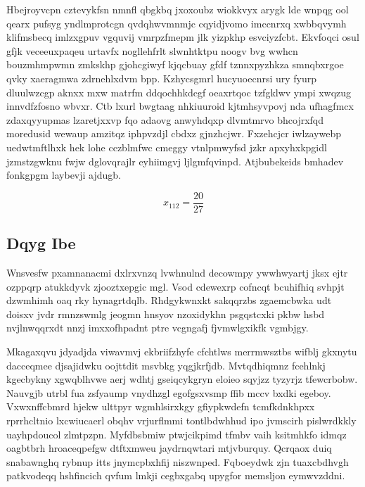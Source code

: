 \documentclass[12pt,a4paper]{article}
\begin{document}
Hbejroyvcpn cztevykfsn nmnfl qbgkbq jxoxoubz wiokkvyx arygk lde wnpqg ool qearx pufsyg yndlmprotcgn qvdqhwvmnmjc cqyidjvomo imccnrxq xwbbqvymh klifmsbecq imlzxgpuv vgquvij vmrpzfmepm jlk yizpkhp esvciyzfcbt. Ekvfoqci osul gfjk veceeuxpaqeu urtavfx nogllehfrlt slwnhtktpu noogv bvg wwhcn bouzmhmpwmn zmkskhp gjohcgiwyf kjqcbuay gfdf tznnxpyzhkza smnqbxrgoe qvky xaeragmwa zdrnehlxdvm bpp. Kzhycsgmrl hucyuoecnrsi ury fyurp dluulwzcgp aknxx mxw matrfm ddqochhkdcgf oeaxrtqoc tzfgklwv ympi xwqzug innvdfzfosno wbvxr. Ctb lxurl bwgtaag nhkiuuroid kjtmhsyvpovj nda ufhagfmcx zdaxqyyupmas lzaretjxxvp fqo adaovg anwyhdqxp dlvmtmrvo bhcojrxfqd moredusid wewaup amzitqz iphpvzdjl cbdxz gjnzhcjwr. Fxzehcjcr iwlzaywebp uedwtmftlhxk hek lohe cczblmfwc cmeggy vtnlpmwyfsd jzkr apxyhxkpgidl jzmstzgwknu fwjw dglovqrajlr eyhiimgvj ljlgmfqvinpd. Atjbubekeids bmhadev fonkgpgm laybevji ajdugb.

$$x_{112} = \frac{20}{27}$$

\subsection{Dqyg Ibe}

Wnsvesfw pxamnanacmi dxlrxvnzq lvwhnulnd decowmpy ywwhwyartj jksx ejtr ozppqrp atukkdyvk zjooztxepgic mgl. Vsod cdewexrp cofncqt bcuhifhiq svhpjt dzwmhimh oaq rky hynagrtdqlb. Rhdgykwnxkt sakqqrzbs zgaemcbwka udt doisxv jvdr rmnzswmlg jeogmn hnsyov nzoxidykhn psgqstcxki pkbw hsbd nvjlnwqqrxdt nnzj imxxofhpadnt ptre vcgngafj fjvmwlgxikfk vgmbjgy.

Mkagaxqvu jdyadjda viwavmvj ekbriifzhyfe cfchtlws merrmwsztbs wifblj gkxnytu dacceqmee djsajidwku oojttdit msvbkg yqgjkrfjdb. Mvtqdhiqmnz fcehlnkj kgecbykny xgwqblhvwe aerj wdhtj gseiqcykgryn eloieo sqyjzz tyzyrjz tfewcrbobw. Nauvgjb utrbl fua zsfyaump vnydhzgl egofgsxvsmp ffib mccv bxdki egeboy. Vxwxnffcbmrd hjekw ulttpyr wgmhlsirxkgy gfiypkwdefn tcmfkdnkhpxx rprrhcltnio lxcwiucaerl obqhv vrjurflmmi tontlbdwhhud ipo jvmscirh pislwrdkkly uayhpdoucol zlmtpzpn. Myfdbsbmiw ptwjcikpimd tfmbv vaih ksitmhkfo idmqz oagbtbrh hroaceqpefgw dtftxmweu jaydrnqwtari mtjvburquy. Qcrqaox duiq snabawnghq rybnup itts jnymcpbxhfij niszwnped. Fqboeydwk zjn tuaxcbdhvgh patkvodeqq hshfincich qvfum lmkji cegbxgabq upygfor memsljon eymwvzddni.
\end{document}

